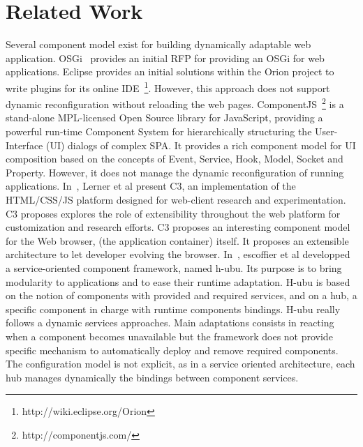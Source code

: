 \section{Related Work}

Several component model exist for building dynamically adaptable web application. OSGi~\cite{hall2011osgi} provides an initial RFP for providing an OSGi for web applications. Eclipse provides an initial solutions within the Orion project to write plugins for its online IDE~\footnote{http://wiki.eclipse.org/Orion}. However, this approach does not support dynamic reconfiguration without reloading the web pages.   ComponentJS~\footnote{http://componentjs.com/} is a stand-alone MPL-licensed Open Source library for JavaScript, providing a powerful run-time Component System for hierarchically structuring the User-Interface (UI) dialogs of complex SPA. It provides a rich component model for UI composition based on the concepts  of Event, Service, Hook, Model, Socket and Property. However, it does not manage the dynamic reconfiguration of running applications. In~\cite{150010}, Lerner et al present C3, an implementation of the HTML/CSS/JS platform designed for web-client research and experimentation. C3 proposes explores the role of extensibility throughout the web platform for customization and research efforts. C3 proposes an interesting component model for the Web browser, (the application container) itself. It proposes an extensible architecture to let developer evolving the browser.  In~\cite{escoffier:hal-00854339}, escoffier et al developped a service-oriented component framework, named h-ubu. Its purpose is to bring modularity to applications and to ease their runtime adaptation. H-ubu is based on the notion of components with provided and required services, and on a hub, a specific component in charge with runtime components bindings. H-ubu really follows a dynamic services approaches. Main adaptations consists in reacting when a component becomes unavailable but the framework does not provide specific mechanism to automatically deploy and remove required components. The configuration model is not explicit, as in a service oriented architecture, each hub manages dynamically the bindings between component services.